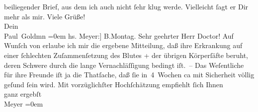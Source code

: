 \begin{ledgroupsized}[t]{13cm}
               beiliegender Brief, aus dem ich auch nicht ſehr klug werde. Vielleicht ſagt er Dir
               mehr als mir.\pend
           \pstart
           Viele Grüße! {\\[\baselineskip]}Dein {\\[\baselineskip]}\spacefill\mbox{Paul Goldmn}\pend
           \leftskip=0em{}{\bigskip}\pstart
           \raggedleft{}{\pb}{[}hs. Meyer:{]} B.Montag.\pend
           \pstart\center{}Sehr geehrter Herr Doctor!\pend\pstart
           Auf Wunſch von \label{K_L03058-2v}\label{K_L03058-2h} erlaube ich mir die ergebene Mitteilung, daß ihre Erkrankung auf einer
               ſchlechten Zuſammenſetzung des Blutes + der übrigen Körperſäfte beruht, deren Schwere
               durch die lange Vernachläſſigung bedingt iſt. –\pend
           \pstart
           Das Weſentliche für {\pb}ihre Freunde iſt ja die
               Thatſache, daß ſie in 4 Wochen ca mit Sicherheit völlig geſund ſein wird.\pend
           \pstart
           Mit vorzüglichſter Hochſchätzung empfiehlt ſich Ihnen {\\[\baselineskip]}ganz ergebſt { }{\\[\baselineskip]}\spacefill\mbox{Meyer}\pend
           \leftskip=0em{}
         
         \endnumbering{}\end{ledgroupsized}  \newcommand{\dateiname}{L03058}\newcommand{\titel}{Paul Goldmann an Arthur Schnitzler, 14. 2. [1901]}\newcommand{\editorInnen}{Martin Anton Müller und Laura Untner}
      